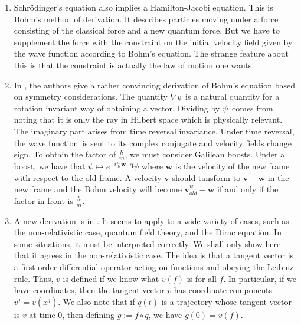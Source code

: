 \documentclass[11pt]{article}
\theoremstyle{remark}
\begin{document}
\begin{enumerate}
\item Schr\"odinger's equation also implies a Hamilton-Jacobi equation. This
is Bohm's method of derivation. It
describes particles moving under a force consisting of the classical
force and a new quantum force. 
But we have to
supplement the force with the constraint on the initial velocity field 
 given by
the wave function according to Bohm's equation. The strange feature
about this is that the constraint is actually the law of motion one
wants. 


\item In \cite{DGZ92}, the authors give a rather convincing derivation
of Bohm's equation based on symmetry considerations. The quantity 
$\nabla \ensuremath{\psi}$ is a natural quantity for a rotation invariant way of
obtaining a vector. Dividing by \ensuremath{\psi}\ comes from noting that it is only
the ray in Hilbert space which is physically relevant. 
The imaginary part arises from time reversal invariance. Under time
reversal, the wave function\ is sent to its complex conjugate and velocity
fields change sign. 
To obtain the
factor of $\frac{\ensuremath{\hbar}}{m}$, we must consider Galilean boosts. Under a
boost, we have that $\ensuremath{\psi} \mapsto e^{-i\frac{m}{\ensuremath{\hbar}} \ensuremath{\boldsymbol{w}} \cdot \ensuremath{\boldsymbol{q}}} \ensuremath{\psi}$ 
where $\ensuremath{\boldsymbol{w}}$ is the velocity of the new frame with respect to the old frame. A
velocity $\ensuremath{\boldsymbol{v}}$ should tansform to $\ensuremath{\boldsymbol{v}} - \ensuremath{\boldsymbol{w}}$ in the new
frame and the
Bohm velocity will become $\ensuremath{\boldsymbol{v}}^{\ensuremath{\psi}}_{old} - \ensuremath{\boldsymbol{w}}$ if and only if the
factor in front is $\frac{\ensuremath{\hbar}}{m}$. 

\item A new derivation is in \cite{DGTuZ03a}. It seems to apply to a
  wide variety of cases, such as the non-relativistic case, 
quantum field theory, and the Dirac equation. In some situations, it
must be interpreted correctly. We shall only show here that it agrees
in the non-relativistic case. The idea is that a tangent vector is a
first-order differential operator acting on functions and obeying the
Leibniz rule. Thus, $v$ is defined if we know what $v(f)$ is for all
$f$. In particular, if we have coordinates, then the tangent vector
$v$ has coordinate components $v^j = v(x^j)$. We also note that if
$q(t)$ is a trajectory whose tangent vector is $v$ at time $0$, then
defining $g \ensuremath{:=} f \circ q$, we have
$\dot{g} (0) = v(f)$. 


\end{enumerate}
\end{document}
